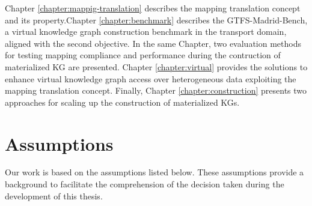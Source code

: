 Chapter \ref{chapter:mappig-translation} describes the mapping translation concept and its property.Chapter \ref{chapter:benchmark} describes the GTFS-Madrid-Bench, a virtual knowledge graph construction benchmark in the transport domain, aligned with the second objective. In the same Chapter, two evaluation methods for testing mapping compliance and performance during the contruction of materialized KG are presented. Chapter \ref{chapter:virtual} provides the solutions to enhance virtual knowledge graph access over heterogeneous data exploiting the mapping translation concept. Finally, Chapter \ref{chapter:construction} presents two approaches for scaling up the construction of materialized KGs. 

\section{Assumptions}
Our work is based on the assumptions listed below. These assumptions provide a background to facilitate the comprehension of the decision taken during the development of this thesis.
